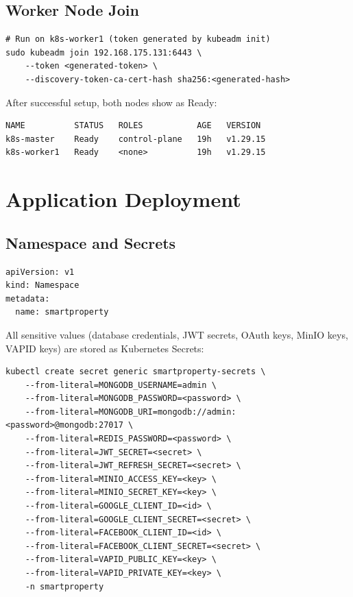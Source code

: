 \documentclass[12pt,a4paper]{report}
\begin{document}
\section{Worker Node Join}

\begin{lstlisting}[style=bashstyle, caption={Worker Node Join Command}]
# Run on k8s-worker1 (token generated by kubeadm init)
sudo kubeadm join 192.168.175.131:6443 \
    --token <generated-token> \
    --discovery-token-ca-cert-hash sha256:<generated-hash>
\end{lstlisting}

\begin{successbox}
After successful setup, both nodes show as Ready:
\begin{verbatim}
NAME          STATUS   ROLES           AGE   VERSION
k8s-master    Ready    control-plane   19h   v1.29.15
k8s-worker1   Ready    <none>          19h   v1.29.15
\end{verbatim}
\end{successbox}

\chapter{Application Deployment}

\section{Namespace and Secrets}

\begin{lstlisting}[style=yamlstyle, caption={Namespace Creation}]
apiVersion: v1
kind: Namespace
metadata:
  name: smartproperty
\end{lstlisting}

All sensitive values (database credentials, JWT secrets, OAuth keys, MinIO keys, VAPID keys) are stored as Kubernetes Secrets:

\begin{lstlisting}[style=bashstyle, caption={Secret Creation}]
kubectl create secret generic smartproperty-secrets \
    --from-literal=MONGODB_USERNAME=admin \
    --from-literal=MONGODB_PASSWORD=<password> \
    --from-literal=MONGODB_URI=mongodb://admin:<password>@mongodb:27017 \
    --from-literal=REDIS_PASSWORD=<password> \
    --from-literal=JWT_SECRET=<secret> \
    --from-literal=JWT_REFRESH_SECRET=<secret> \
    --from-literal=MINIO_ACCESS_KEY=<key> \
    --from-literal=MINIO_SECRET_KEY=<key> \
    --from-literal=GOOGLE_CLIENT_ID=<id> \
    --from-literal=GOOGLE_CLIENT_SECRET=<secret> \
    --from-literal=FACEBOOK_CLIENT_ID=<id> \
    --from-literal=FACEBOOK_CLIENT_SECRET=<secret> \
    --from-literal=VAPID_PUBLIC_KEY=<key> \
    --from-literal=VAPID_PRIVATE_KEY=<key> \
    -n smartproperty
\end{lstlisting}
\end{document}
